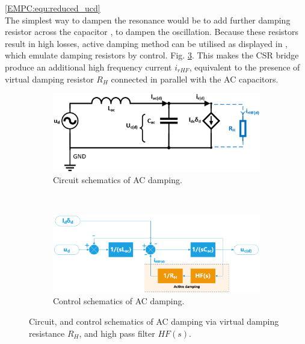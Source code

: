      \ref{EMPC:equ:reduced_ucd}\\
    The simplest way to dampen the resonance would be to add further damping resistor across the capacitor \cite{regaya2014new}, to dampen the oscillation. Because these resistors result in high losses, active damping method can be utilised as displayed in \cite{wiseman2002pwm}, which emulate damping resistors by control.  Fig. \ref{EMPC:fig:ACdamping}. This makes the CSR bridge produce an additional high frequency current $i_{rHF}$, equivalent to the presence of virtual damping resistor $R_H$ connected in parallel with the AC capacitors.

    \begin{figure}
                \centering
                \begin{subfigure}[b]{.6\textwidth}
                    \includegraphics[width=\textwidth]{EMPC_PNG_Pics/ACdamping.png}
                    \caption{\centering Circuit schematics of AC damping.}
                    \label{EMPC:fig:ACdamping_a}
                \end{subfigure}
                ~ %
                \begin{subfigure}[b]{.6\textwidth}
                    \includegraphics[width=\textwidth]{EMPC_PNG_Pics/ACchart.png}
                    \caption{\centering Control schematics of AC damping.}
                    \label{EMPC:fig:ACdamping_b}
                \end{subfigure}
                \caption{Circuit, and control schematics of AC damping via virtual damping resistance $R_H$, and high pass filter $HF(s)$.}
                \label{EMPC:fig:ACdamping}
            \end{figure}

